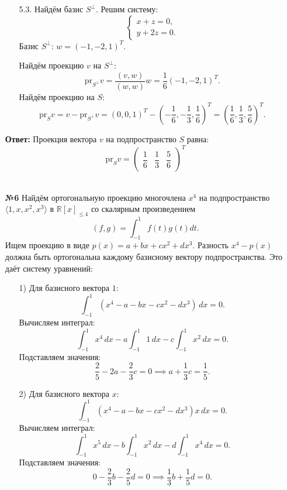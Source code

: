\documentclass[a4paper]{article}
\begin{document}
\begin{enumerate}
\begin{enumerate}
        \item[5.3.]Найдём базис \( S^\perp \). Решим систему:
        \[
        \begin{cases}
        x + z = 0, \\
        y + 2z = 0.
        \end{cases}
        \]
        Базис \( S^\perp \): \( w = (-1, -2, 1)^T \).

        Найдём проекцию \( v \) на \( S^\perp \):
        \[
        \text{pr}_{S^\perp} v = \frac{(v, w)}{(w, w)} w = \frac{1}{6} (-1, -2, 1)^T.
        \]
        Найдём проекцию на \( S \):
        \[
        \text{pr}_S v = v - \text{pr}_{S^\perp} v = (0, 0, 1)^T - \left(-\frac{1}{6}, -\frac{1}{3}, \frac{1}{6}\right)^T = \left(\frac{1}{6}, \frac{1}{3}, \frac{5}{6}\right)^T.
        \]
        
    \end{enumerate}
    \textbf{Ответ: }
    Проекция вектора \( v \) на подпространство \( S \) равна:
    \[
    \text{pr}_S v = \begin{pmatrix} \dfrac{1}{6} & \dfrac{1}{3} & \dfrac{5}{6} \end{pmatrix}^T
    \]\\

    \item[\textbf{№6}]Найдём ортогональную проекцию многочлена \( x^4 \) на подпространство \(\langle 1, x, x^2, x^3 \rangle\) в \(\mathbb{R}[x]_{\leqslant 4}\) со скалярным произведением
    \[
    (f, g) = \int_{-1}^{1} f(t)g(t)dt.
    \]
    Ищем проекцию в виде \( p(x) = a + bx + cx^2 + dx^3 \). Разность \( x^4 - p(x) \) должна быть ортогональна каждому базисному вектору подпространства. Это даёт систему уравнений:

    \begin{enumerate}
        \item[1)]
        Для базисного вектора \(1\):
        \[
        \int_{-1}^{1} (x^4 - a - bx - cx^2 - dx^3) \, dx = 0.
        \]
        Вычисляем интеграл:
        \[
        \int_{-1}^{1} x^4 \, dx - a \int_{-1}^{1} 1 \, dx - c \int_{-1}^{1} x^2 \, dx = 0.
        \]
        Подставляем значения:
        \[
        \frac{2}{5} - 2a - \frac{2}{3}c = 0 \implies a + \frac{1}{3}c = \frac{1}{5}.
        \]

        \item[2)]Для базисного вектора \(x\):
        \[
        \int_{-1}^{1} (x^4 - a - bx - cx^2 - dx^3)x \, dx = 0.
        \]
        Вычисляем интеграл:
        \[
        \int_{-1}^{1} x^5 \, dx - b \int_{-1}^{1} x^2 \, dx - d \int_{-1}^{1} x^4 \, dx = 0.
        \]
        Подставляем значения:
        \[
        0 - \frac{2}{3}b - \frac{2}{5}d = 0 \implies \frac{1}{3}b + \frac{1}{5}d = 0.
        \]


\end{enumerate}
\end{enumerate}
\end{document}

